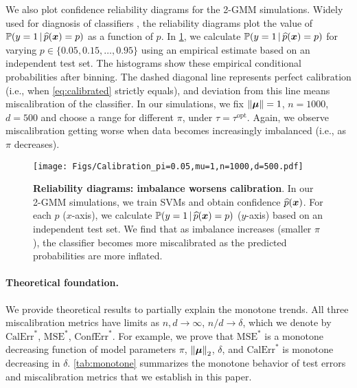 We also plot confidence reliability diagrams for the 2-GMM simulations. Widely used for diagnosis of classifiers \cite{guo2017calibration}, the reliability diagrams plot the value of $\mathbb{P}(y=1 \,|\, \widehat p({\boldsymbol{x}}) = p)$ as a function of $p$. In \cref{fig:reliability_GMM}, we calculate $\mathbb{P}(y=1 \,|\, \widehat p({\boldsymbol{x}}) = p)$ for varying $p \in \{0.05, 0.15, \ldots, 0.95\}$ using an empirical estimate based on an independent test set. The histograms show these empirical conditional probabilities after binning. The dashed diagonal line represents perfect calibration (i.e., when \cref{eq:calibrated} strictly equals), and deviation from this line means miscalibration of the classifier. 
    In our simulations, we fix $\left\|{\text{\boldmath $\mu$}}\right\|=1$, $n=1000$, $d=500$ and choose a range for different $\pi$, under $\tau = \tau^\mathrm{opt}$. Again, we observe miscalibration getting worse when data becomes increasingly imbalanced (i.e., as $\pi$ decreases).


\begin{figure}[h]
    \centering
    \texttt{[image: Figs/Calibration\_pi=0.05,mu=1,n=1000,d=500.pdf]}
    \caption{
    \textbf{Reliability diagrams: imbalance worsens calibration}. In our 2-GMM simulations, we train SVMs and obtain confidence $\widehat p({\boldsymbol{x}})$. For each $p$ ($x$-axis), we calculate $\mathbb{P}(y=1 \,|\, \widehat p({\boldsymbol{x}}) = p)$ ($y$-axis) based on an independent test set. We find that as imbalance increases (smaller $\pi$), the classifier becomes more miscalibrated as the predicted probabilities are more inflated.
    }
    \label{fig:reliability_GMM}
\end{figure}

\paragraph{Theoretical foundation.} 

We provide theoretical results to partially explain the monotone trends. All three miscalibration metrics have limits as $n, d \to \infty$, $n/d \to \delta$, which we denote by $\mathrm{CalErr}^*$, $\mathrm{MSE}^*$, $\mathrm{ConfErr}^*$. For example, we prove that $\mathrm{MSE}^*$ is a monotone decreasing function of model parameters $\pi$, $\left\|{\text{\boldmath $\mu$}}\right\|_2$, $\delta$, and $\mathrm{CalErr}^*$ is monotone decreasing in $\delta$. \cref{tab:monotone} summarizes the monotone behavior of test errors and miscalibration metrics that we 
establish
in this paper.



